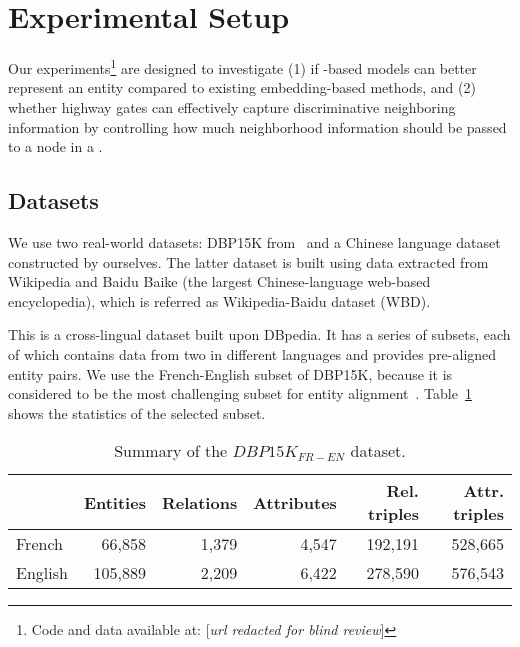 \section{Experimental Setup}
	Our experiments\footnote{Code and data available at: [\emph{url redacted for blind review}]} are designed to investigate (1) if \RGCN-based models can better represent an entity  compared to existing \KG
embedding-based methods, and (2) whether highway gates can effectively capture discriminative neighboring information by controlling how
much neighborhood information should be passed to a node in a \RGCN.

\subsection{Datasets}
\label{subsection:datasets}
	We use two real-world datasets: DBP15K from~\cite{sun2017cross} and a Chinese language dataset constructed by ourselves. The latter
dataset is built using data extracted from Wikipedia and Baidu Baike (the largest Chinese-language web-based encyclopedia), which is
referred as Wikipedia-Baidu dataset (WBD).
	
	 This is a cross-lingual dataset built upon DBpedia.
	It has a series of subsets, each of which contains data from two \KGs in different languages and provides pre-aligned entity pairs.
	We use the French-English subset of DBP15K, because it is considered to be the most challenging subset for entity alignment~\cite{sun2017cross}.
     Table~\ref{dbp} shows the statistics of the selected subset.
	
		\begin{table}
		\centering
		\scriptsize
		\begin{tabular}{l|rrrrr}
			\toprule
			&\bf  Entities &\bf  Relations &\bf  Attributes &\bf  Rel. triples &\bf  Attr. triples \\
			\midrule
			French & 66,858 & 1,379 & 4,547 & 192,191 & 528,665 \\
			English & 105,889 & 2,209 & 6,422 & 278,590 & 576,543 \\
			\bottomrule
		\end{tabular}
		\caption{Summary of the $DBP15K_{FR-EN}$ dataset.}
		\label{dbp}
	\end{table}
	
%	
%	
	
